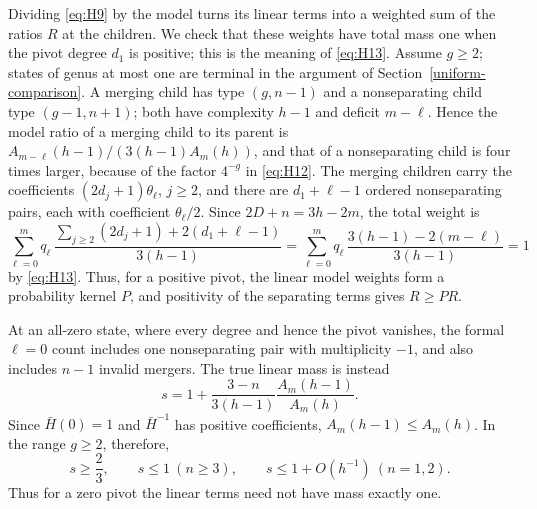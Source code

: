Dividing \eqref{eq:H9} by the model turns its linear terms into a
weighted sum of the ratios \(R\) at the children. We check that these
weights have total mass one when the pivot degree \(d_1\) is positive;
this is the meaning of \eqref{eq:H13}. Assume \(g\ge2\); states of genus at
most one are terminal in the argument of Section~\ref{uniform-comparison}.
A merging child has type \((g,n-1)\) and a nonseparating child type
\((g-1,n+1)\); both have complexity \(h-1\) and deficit \(m-\ell\). Hence the
model ratio of a merging child to its parent is
\(A_{m-\ell}(h-1)/(3(h-1)A_m(h))\), and that of a nonseparating child is four
times larger, because of the factor \(4^{-g}\) in \eqref{eq:H12}. The
merging children carry the coefficients \((2d_j+1)\theta_\ell\), \(j\ge2\),
and there are \(d_1+\ell-1\) ordered nonseparating pairs, each with
coefficient \(\theta_\ell/2\). Since \(2D+n=3h-2m\), the total weight is
\[
 \sum_{\ell=0}^m q_\ell\,
 \frac{\sum_{j\ge2}(2d_j+1)+2(d_1+\ell-1)}{3(h-1)}
 =\sum_{\ell=0}^m q_\ell\,\frac{3(h-1)-2(m-\ell)}{3(h-1)}=1
\]
by \eqref{eq:H13}. Thus, for a positive pivot, the linear model weights form
a probability kernel \(P\), and positivity of the separating terms gives
\(R\ge PR\).

At an all-zero state, where every degree and hence the pivot vanishes,
the formal \(\ell=0\) count includes one
nonseparating pair with multiplicity \(-1\), and also includes \(n-1\)
invalid mergers. The true linear mass is instead \begin{equation}
s=1+\frac{3-n}{3(h-1)}
       \frac{A_m(h-1)}{A_m(h)}.
\label{eq:H14}
\end{equation} Since \(\bar H(0)=1\) and \(\bar H^{-1}\) has positive coefficients,
\(A_m(h-1)\le A_m(h)\). In the range \(g\ge2\), therefore, \begin{equation}
s\ge\frac23,\qquad
s\le1\ (n\ge3),\qquad s\le1+O(h^{-1})\ (n=1,2).
\label{eq:H15}
\end{equation} Thus for a zero pivot the linear terms need not have mass exactly one.

